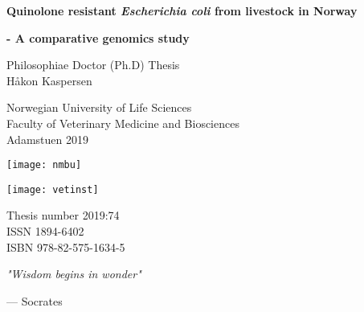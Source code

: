 \frontmatter
{}
{
\pagestyle{empty}
\graphicspath{ {./images/pdfs/} }
\begin{titlepage}
   \begin{center}
       
       \huge
       
       \textbf{Quinolone resistant \textit{Escherichia coli} from livestock in Norway}
       
       \LARGE
       
       \textbf{- A comparative genomics study}
 
       \vspace{1.5cm}
       
       \large
       Philosophiae Doctor (Ph.D) Thesis\\
       Håkon Kaspersen
 
       \vspace{1cm}
       
       Norwegian University of Life Sciences\\
       Faculty of Veterinary Medicine and Biosciences\\
       Adamstuen 2019
       
       \texttt{[image: nmbu]}
       
       \vspace{1cm}
       
       \texttt{[image: vetinst]}
       
       \vfill

 
       \vspace{1cm}
       \normalsize
 
       Thesis number 2019:74\\
       ISSN 1894-6402\\
       ISBN 978-82-575-1634-5
 
   \end{center}
\end{titlepage}

\begin{titlepage}
   \null
   \vspace*{\fill}
   \renewcommand{\epigraphsize}{\large}
   \epigraph{\textit{"Wisdom begins in wonder"}}{--- \textup{Socrates}}
\end{titlepage}
}